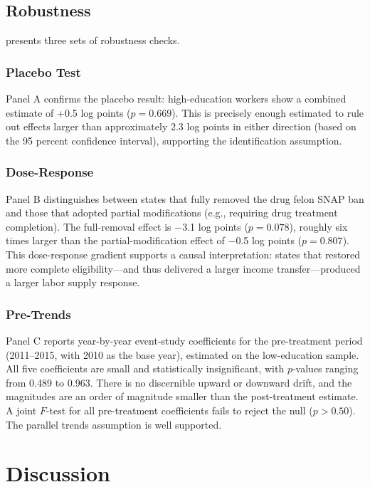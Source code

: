 \documentclass[12pt]{article}
\begin{document}
\subsection{Robustness}

 presents three sets of robustness checks.



\subsubsection*{Placebo Test} Panel A confirms the placebo result: high-education workers show a combined estimate of +0.5 log points ($p = 0.669$). This is precisely enough estimated to rule out effects larger than approximately 2.3 log points in either direction (based on the 95 percent confidence interval), supporting the identification assumption.

\subsubsection*{Dose-Response} Panel B distinguishes between states that fully removed the drug felon SNAP ban and those that adopted partial modifications (e.g., requiring drug treatment completion). The full-removal effect is $-$3.1 log points ($p = 0.078$), roughly six times larger than the partial-modification effect of $-$0.5 log points ($p = 0.807$). This dose-response gradient supports a causal interpretation: states that restored more complete eligibility---and thus delivered a larger income transfer---produced a larger labor supply response.

\subsubsection*{Pre-Trends} Panel C reports year-by-year event-study coefficients for the pre-treatment period (2011--2015, with 2010 as the base year), estimated on the low-education sample. All five coefficients are small and statistically insignificant, with $p$-values ranging from 0.489 to 0.963. There is no discernible upward or downward drift, and the magnitudes are an order of magnitude smaller than the post-treatment estimate. A joint $F$-test for all pre-treatment coefficients fails to reject the null ($p > 0.50$). The parallel trends assumption is well supported.

\section{Discussion}
\end{document}
